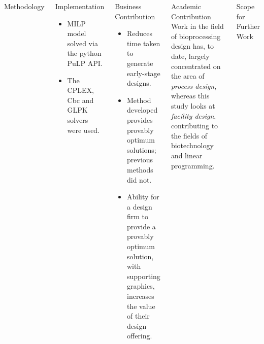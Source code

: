 \documentclass[final]{beamer}
\begin{document}
\begin{frame}[t]
\begin{columns}[t]
\begin{block}{\huge Methodology}
                \end{block}
                \begin{block}{\huge Implementation}
                    \begin{itemize}
                        \item MILP model solved via the python PuLP API.
                        \item The CPLEX, Cbc and GLPK solvers were used.
                    \end{itemize}
                \end{block}
                \begin{block}{\huge Business Contribution}
                    \begin{itemize}
                        \item Reduces time taken to generate early-stage
                            designs.
                        \item Method developed provides provably optimum
                            solutions; previous methods did not.
                        \item Ability for a design firm to provide a provably
                            optimum solution, with supporting graphics,
                            increases the value of their design offering.
                    \end{itemize}
                \end{block}
                \begin{block}{\huge Academic Contribution}
                    Work in the field of bioprocessing design has, to date,
                    largely concentrated on the area of \emph{process design},
                    whereas this study looks at \emph{facility design},
                    contributing to the fields of biotechnology and
                    linear programming.
                \end{block}
                \begin{block}{\huge Scope for Further Work}
                    \begin{itemize}

\end{itemize}
\end{block}
\end{columns}
\end{frame}
\end{document}
